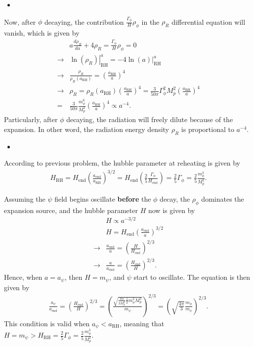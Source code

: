 \begin{itemize}
    \item [(b)]
\end{itemize}

Now, after $\phi$ decaying, the contribution $\frac{\Gamma_\phi}{H}\rho_\phi$ in the $\rho_R$ differential equation will vanish, which is given by 
\begin{align}
    &a \frac{d\rho_R}{da}+4 \rho_R=\frac{\Gamma_\phi}{H}\rho_\phi=0\\
    \rightarrow & \left. \ln(\rho_R) \right|_{\text{RH}}^{a} =  \left. -4\ln(a) \right|_{\text{RH}}^{a}\\
    \rightarrow & \frac{\rho_R}{\rho_R(a_\text{RH})}= \left(\frac{a_\text{RH}}{a}\right)^4\\
    \rightarrow & \rho_R =  \rho_R(a_\text{RH})\left(\frac{a_\text{RH}}{a}\right)^4 = \frac{3}{50\pi} \Gamma_\phi^2 M_p^2 \left(\frac{a_\text{RH}}{a}\right)^4 \\
    =& \frac{3}{50\pi} \frac{m_\phi^6}{M_p^2} \left(\frac{a_\text{RH}}{a}\right)^4 \propto a^{-4}.
\end{align}
Particularly, after $\phi$ decaying, the radiation will freely dilute because of the expansion. In other word, the radiation energy density $\rho_R$ is proportional to $a^{-4}$.


\begin{itemize}
    \item [(c)]
\end{itemize}
According to previous problem, the hubble parameter at reheating is given by 
\begin{align}
    H_\text{RH} = H_\text{end} \left( \frac{a_\text{end}}{a_\text{RH}} \right)^{3/2} = H_\text{end} \left( \frac{2}{5} \frac{\Gamma_\phi}{H_\text{end}} \right) = \frac{2}{5} \Gamma_\phi = \frac{2}{5} \frac{m_\phi^3}{M_p^2}.
\end{align}

Assuming the $\psi$ field begins oscillate \textbf{before} the $\phi$ decay, the $\rho_\phi$ dominates the expansion source, and the hubble parameter $H$ now is given by 
\begin{align}
    &H\propto a^{-3/2} \\
    &H=H_\text{end}\left(\frac{a_\text{end}}{a}\right)^{3/2}\\
    \rightarrow& \frac{a_\text{end}}{a} = \left(\frac{H}{H_\text{end}}\right)^{2/3}\\
    \rightarrow& \frac{a}{a_\text{end}} = \left(\frac{H_\text{end}}{H}\right)^{2/3}.
\end{align}
Hence, when $a=a_\psi$, then $H=m_\psi$, and $\psi$ start to oscillate. The equation is then given by 
\begin{align}
    \frac{a_\psi}{a_\text{end}}=\left(\frac{H_\text{end}}{H}\right)^{2/3}= \left(\frac{ \sqrt{\frac{8\pi}{3M_p^2} \frac{1}{2}m_\phi^2 M_p^2}}{m_\psi}\right)^{2/3}=\left(\sqrt{\frac{4\pi}{3}}\frac{m_\phi}{m_\psi}\right)^{2/3}.
\end{align}
This condition is valid when $a_\psi<a_\text{RH}$, meaning that $H=m_\psi>H_\text{RH}=\frac{2}{5} \Gamma_\phi = \frac{2}{5} \frac{m_\phi^3}{M_p^2}$.

